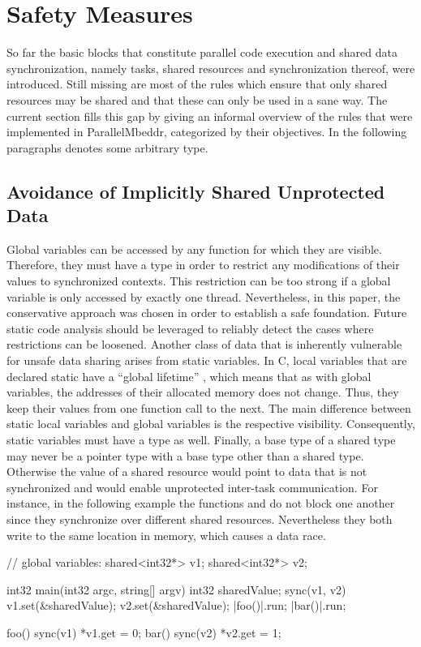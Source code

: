 \section{Safety Measures}
\label{safetyMeasures}
So far the basic blocks that constitute parallel code execution and shared data synchronization, namely tasks, shared resources and synchronization thereof, were introduced. Still missing are most of the rules which ensure that only shared resources may be shared and that these can only be used in a sane way. The current section fills this gap by giving an informal overview of the rules that were implemented in ParallelMbeddr, categorized by their objectives. In the following paragraphs  denotes some arbitrary type.

\subsection{Avoidance of Implicitly Shared Unprotected Data}
Global variables can be accessed by any function for which they are visible. Therefore, they must have a type  in order to restrict any modifications of their values to synchronized contexts. This restriction can be too strong if a global variable is only accessed by exactly one thread. Nevertheless, in this paper, the conservative approach was chosen in order to establish a safe foundation. Future static code analysis should be leveraged to reliably detect the cases where restrictions can be loosened.
Another class of data that is inherently vulnerable for unsafe data sharing arises from static variables. In C, local variables that are declared static have a ``global lifetime'' \cite[p.~439]{ProgrammingInC}, which means that as with global variables, the addresses of their allocated memory does not change. Thus, they keep their values from one function call to the next. The main difference between static local variables and global variables is the respective visibility. Consequently, static variables must have a type  as well.
Finally, a base type  of a shared type may never be a pointer type with a base type other than a shared type. Otherwise the value of a shared resource would point to data that is not synchronized and would enable unprotected inter-task communication. For instance, in the following example the functions  and  do not block one another since they synchronize over different shared resources. Nevertheless they both write to the same location in memory, which causes a data race.
\begin{ccode}
// global variables:
shared<int32*> v1;
shared<int32*> v2;

int32 main(int32 argc, string[] argv) {
  int32 sharedValue;
  sync(v1, v2) {
    v1.set(&sharedValue);
    v2.set(&sharedValue);
  }
  |foo()|.run;
  |bar()|.run;
}

foo() {
  sync(v1) { *v1.get = 0; }
}
bar() {
  sync(v2) { *v2.get = 1; }
}
\end{ccode}

